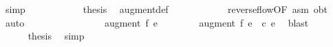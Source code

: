{\ simp\isanewline
\ \ \ \ \ \ \ \ \isamarkupfalse%
\ \isamarkupfalse%
\ {\isacharquery}thesis\ \isamarkupfalse%
\ augment{\isacharunderscore}def\isanewline
\ \ \ \ \ \ \ \ \ \ \isamarkupfalse%
\ reverse{\isacharunderscore}flow{\isacharbrackleft}OF\ asm{\isacharbrackright}\ obt\ \isamarkupfalse%
\ auto\isanewline
\ \ \ \ \ \ \isamarkupfalse%
\isanewline
\ \ \ \ \isamarkupfalse%
\ \isamarkupfalse%
\ {\isachardoublequoteopen}{}\ {\isasymle}\ {\isacharparenleft}augment\ f{\isacharprime}{\isacharparenright}\ e\ {\isasymand}\ \isanewline
\ \ \ \ \ \ {\isacharparenleft}augment\ f{\isacharprime}{\isacharparenright}\ e\ {\isasymle}\ c\ e{\isachardoublequoteclose}\ \isamarkupfalse%
\ blast\ \ \ \isanewline
\ \ \isacommand{{\isacharbraceright}}\isamarkupfalse%
\isanewline
\ \ \ \ \isamarkupfalse%
\ {\isacharquery}thesis\ \isamarkupfalse%
\ simp\isanewline
\ \ \isamarkupfalse%
}%



